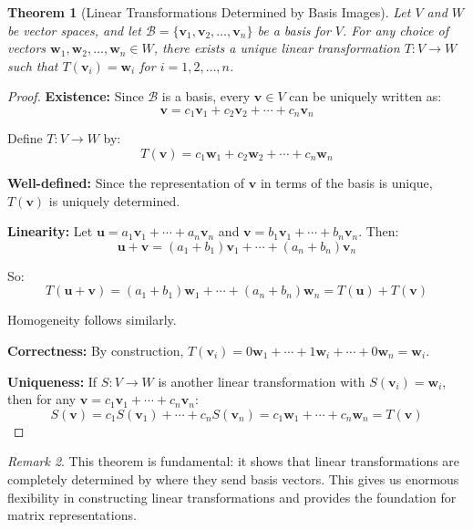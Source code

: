 \documentclass[12pt]{article}
\numberwithin{equation}{section}
\newcommand{\vect}[1]{\boldsymbol{#1}}   %
\theoremstyle{plain}
\newtheorem{theorem}{Theorem}[section]
\theoremstyle{definition}
\theoremstyle{remark}
\newtheorem{remark}[theorem]{Remark}
\begin{document}
\begin{theorem}[Linear Transformations Determined by Basis Images]
Let $V$ and $W$ be vector spaces, and let $\mathcal{B} = \{\vect{v}_1, \vect{v}_2, \ldots, \vect{v}_n\}$ be a basis for $V$. For any choice of vectors $\vect{w}_1, \vect{w}_2, \ldots, \vect{w}_n \in W$, there exists a unique linear transformation $T: V \to W$ such that $T(\vect{v}_i) = \vect{w}_i$ for $i = 1, 2, \ldots, n$.
\end{theorem}

\begin{proof}
\textbf{Existence:} Since $\mathcal{B}$ is a basis, every $\vect{v} \in V$ can be uniquely written as:
$$\vect{v} = c_1\vect{v}_1 + c_2\vect{v}_2 + \cdots + c_n\vect{v}_n$$

Define $T: V \to W$ by:
$$T(\vect{v}) = c_1\vect{w}_1 + c_2\vect{w}_2 + \cdots + c_n\vect{w}_n$$

\textbf{Well-defined:} Since the representation of $\vect{v}$ in terms of the basis is unique, $T(\vect{v})$ is uniquely determined.

\textbf{Linearity:} Let $\vect{u} = a_1\vect{v}_1 + \cdots + a_n\vect{v}_n$ and $\vect{v} = b_1\vect{v}_1 + \cdots + b_n\vect{v}_n$. Then:
$$\vect{u} + \vect{v} = (a_1 + b_1)\vect{v}_1 + \cdots + (a_n + b_n)\vect{v}_n$$

So:
$$T(\vect{u} + \vect{v}) = (a_1 + b_1)\vect{w}_1 + \cdots + (a_n + b_n)\vect{w}_n = T(\vect{u}) + T(\vect{v})$$

Homogeneity follows similarly.

\textbf{Correctness:} By construction, $T(\vect{v}_i) = 0\vect{w}_1 + \cdots + 1\vect{w}_i + \cdots + 0\vect{w}_n = \vect{w}_i$.

\textbf{Uniqueness:} If $S: V \to W$ is another linear transformation with $S(\vect{v}_i) = \vect{w}_i$, then for any $\vect{v} = c_1\vect{v}_1 + \cdots + c_n\vect{v}_n$:
$$S(\vect{v}) = c_1S(\vect{v}_1) + \cdots + c_nS(\vect{v}_n) = c_1\vect{w}_1 + \cdots + c_n\vect{w}_n = T(\vect{v})$$
\end{proof}

\begin{remark}
This theorem is fundamental: it shows that linear transformations are completely determined by where they send basis vectors. This gives us enormous flexibility in constructing linear transformations and provides the foundation for matrix representations.
\end{remark}
\end{document}
